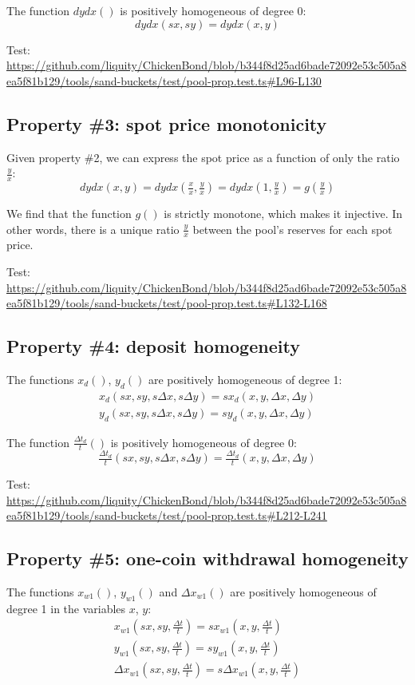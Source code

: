 \documentclass{article}
\begin{document}
The function $dydx()$ is positively homogeneous of degree 0:
\[
dydx(sx, sy) = dydx(x, y)
\]

Test:
\url{https://github.com/liquity/ChickenBond/blob/b344f8d25ad6bade72092e53c505a8ea5f81b129/tools/sand-buckets/test/pool-prop.test.ts#L96-L130}

\subsection{Property \#3: spot price monotonicity}

Given property \#2, we can express the spot price as a function of only the ratio $\frac{y}{x}$:
\[
dydx(x, y) = dydx(\tfrac{x}{x}, \tfrac{y}{x}) = dydx(1, \tfrac{y}{x}) = g(\tfrac{y}{x})
\]

We find that the function $g()$ is strictly monotone, which makes it injective. In other words, there is a unique ratio $\frac{y}{x}$ between the pool's reserves for each spot price.

Test:
\url{https://github.com/liquity/ChickenBond/blob/b344f8d25ad6bade72092e53c505a8ea5f81b129/tools/sand-buckets/test/pool-prop.test.ts#L132-L168}

\subsection{Property \#4: deposit homogeneity}

The functions $x_d()$, $y_d()$ are positively homogeneous of degree 1:
\begin{gather*}
x_d(sx, sy, s\Delta{x}, s\Delta{y}) = s x_d(x, y, \Delta{x}, \Delta{y}) \\
y_d(sx, sy, s\Delta{x}, s\Delta{y}) = s y_d(x, y, \Delta{x}, \Delta{y})
\end{gather*}

The function $\tfrac{\Delta{t}_d}{t}()$ is positively homogeneous of degree 0:
\[
\tfrac{\Delta{t}_d}{t}(sx, sy, s\Delta{x}, s\Delta{y}) = \tfrac{\Delta{t}_d}{t}(x, y, \Delta{x}, \Delta{y})
\]

Test:
\url{https://github.com/liquity/ChickenBond/blob/b344f8d25ad6bade72092e53c505a8ea5f81b129/tools/sand-buckets/test/pool-prop.test.ts#L212-L241}

\subsection{Property \#5: one-coin withdrawal homogeneity}

The functions $x_{w1}()$, $y_{w1}()$ and $\Delta{x}_{w1}()$ are positively homogeneous of degree 1 in the variables $x$, $y$:
\begin{gather*}
  x_{w1}(sx, sy, \tfrac{\Delta{t}}{t}) = sx_{w1}(x, y, \tfrac{\Delta{t}}{t}) \\
  y_{w1}(sx, sy, \tfrac{\Delta{t}}{t}) = sy_{w1}(x, y, \tfrac{\Delta{t}}{t}) \\
  \Delta{x}_{w1}(sx, sy, \tfrac{\Delta{t}}{t}) = s \Delta{x}_{w1}(x, y, \tfrac{\Delta{t}}{t})
\end{gather*}
  
\end{document}
